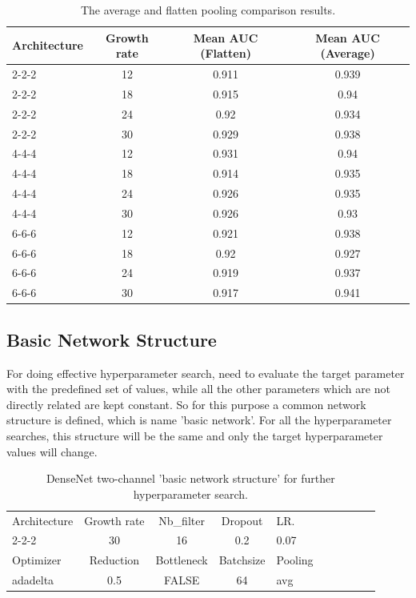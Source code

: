 \begin{table}[ht]
\centering
 \caption[The average and flatten pooling comparison results.]{The average and flatten pooling comparison results.}
\begin{tabular}{|l | c| c| c|} 
 \hline\hline
 \rowcolor{lightgrey}
 Architecture & Growth rate & Mean AUC (Flatten) & Mean AUC (Average)\\[0.5ex]
 \hline
 2-2-2 & 12 & 0.911 & 0.939\\
 2-2-2 & 18 & 0.915 & 0.94\\
 2-2-2 & 24 & 0.92 & 0.934\\
 2-2-2 & 30 & 0.929 & 0.938\\
 4-4-4 & 12 & 0.931 & 0.94\\
 4-4-4 & 18 & 0.914 & 0.935\\
 4-4-4 & 24 & 0.926 & 0.935\\
 4-4-4 & 30 & 0.926 & 0.93\\
 6-6-6 & 12 & 0.921 & 0.938\\
 6-6-6 & 18 & 0.92 & 0.927\\
 6-6-6 & 24 & 0.919 & 0.937\\
 6-6-6 & 30 & 0.917 & 0.941\\ \hline \hline
 \end{tabular}
\label{table:pooling_comparison_across_gr}
\end{table}

\subsection{Basic Network Structure}
For doing effective hyperparameter search, need to evaluate the target parameter with the predefined set of values, while all the other parameters which are not directly related are kept constant. So for this purpose a common 
network structure is defined, which is name 'basic network'. For all the hyperparameter searches, this structure will be the same and only the target hyperparameter values will change.
\begin{table}
 \centering
\caption{DenseNet two-channel 'basic network structure' for further hyperparameter search.}
\begin{tabular}{|l | c| c| c| l| c| l | c| c| |l|} 
\hline\hline
 \rowcolor{lightgrey}
 Architecture & Growth rate & Nb\_filter & Dropout & LR. \\ 
 2-2-2 & 30 & 16 & 0.2 & 0.07 \\ 
 \hline
 \rowcolor{lightgrey}
 Optimizer & Reduction & Bottleneck & Batchsize & Pooling\\[0.5ex]
 \hline
 adadelta & 0.5 & FALSE & 64 & avg\\
 \hline \hline
\end{tabular}
\label{basic_dtc_network}
\end{table}

